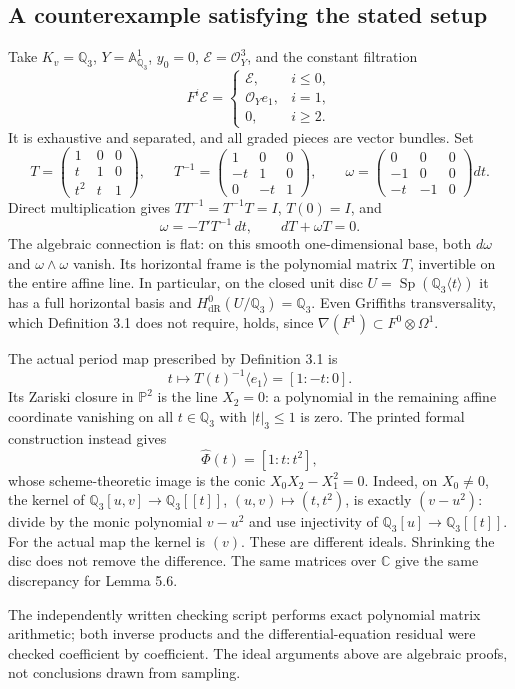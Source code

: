 \documentclass[10pt]{article}
\begin{document}
\subsection*{A counterexample satisfying the stated setup}
Take \(K_v=\mathbb Q_3\), \(Y=\mathbb A^1_{\mathbb Q_3}\), \(y_0=0\), \(\mathcal E=\mathcal O_Y^3\), and the constant filtration \[F^i\mathcal E=
\begin{cases}
\mathcal E,&i\leq0,\\
\mathcal O_Y e_1,&i=1,\\
0,&i\geq2.
\end{cases}\] It is exhaustive and separated, and all graded pieces are vector bundles. Set \[T=\begin{pmatrix}1&0&0\\t&1&0\\t^2&t&1\end{pmatrix},
\qquad
T^{-1}=\begin{pmatrix}1&0&0\\-t&1&0\\0&-t&1\end{pmatrix},
\qquad
\omega=\begin{pmatrix}0&0&0\\-1&0&0\\-t&-1&0\end{pmatrix}dt .\] Direct multiplication gives \(TT^{-1}=T^{-1}T=I\), \(T(0)=I\), and \[\omega=-T'T^{-1}\,dt,\qquad dT+\omega T=0.\] The algebraic connection is flat: on this smooth one-dimensional base, both \(d\omega\) and \(\omega\wedge\omega\) vanish. Its horizontal frame is the polynomial matrix \(T\), invertible on the entire affine line. In particular, on the closed unit disc \(U=\operatorname{Sp}(\mathbb Q_3\langle t\rangle)\) it has a full horizontal basis and \(H^0_{\mathrm{dR}}(U/\mathbb Q_3)=\mathbb Q_3\). Even Griffiths transversality, which Definition 3.1 does not require, holds, since \(\nabla(F^1)\subset F^0\otimes\Omega^1\).\par
The actual period map prescribed by Definition 3.1 is \[t\longmapsto T(t)^{-1}\langle e_1\rangle=[1:-t:0].\] Its Zariski closure in \(\mathbb P^2\) is the line \(X_2=0\): a polynomial in the remaining affine coordinate vanishing on all \(t\in\mathbb Q_3\) with \(|t|_3\leq1\) is zero. The printed formal construction instead gives \[\widehat\Phi(t)=[1:t:t^2],\] whose scheme-theoretic image is the conic \(X_0X_2-X_1^2=0\). Indeed, on \(X_0\ne0\), the kernel of \(\mathbb Q_3[u,v]\longrightarrow\mathbb Q_3[[t]]\), \((u,v)\mapsto(t,t^2)\), is exactly \((v-u^2)\): divide by the monic polynomial \(v-u^2\) and use injectivity of \(\mathbb Q_3[u]\to\mathbb Q_3[[t]]\). For the actual map the kernel is \((v)\). These are different ideals. Shrinking the disc does not remove the difference. The same matrices over \(\mathbb C\) give the same discrepancy for Lemma 5.6.\par
The independently written checking script performs exact polynomial matrix arithmetic; both inverse products and the differential-equation residual were checked coefficient by coefficient. The ideal arguments above are algebraic proofs, not conclusions drawn from sampling.\par
\end{document}
